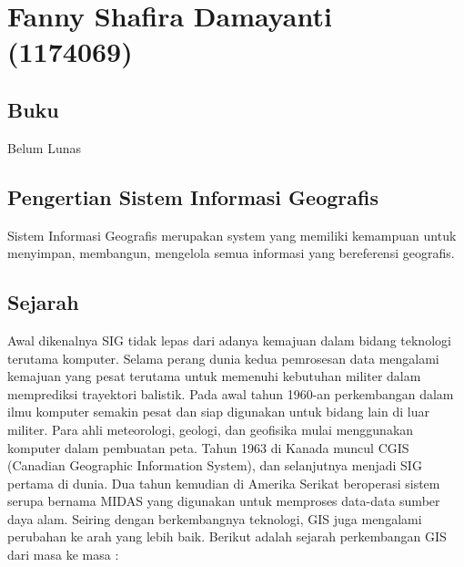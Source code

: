 \section{Fanny Shafira Damayanti (1174069)}
\subsection{Buku}
Belum Lunas
\subsection{Pengertian Sistem Informasi Geografis}
Sistem Informasi Geografis merupakan system yang memiliki kemampuan untuk menyimpan, membangun, mengelola semua informasi yang bereferensi geografis.
\subsection{Sejarah}
Awal dikenalnya SIG tidak lepas dari adanya kemajuan dalam bidang teknologi terutama komputer. Selama perang dunia kedua pemrosesan data mengalami kemajuan yang pesat terutama untuk memenuhi kebutuhan militer dalam memprediksi trayektori balistik. Pada awal tahun 1960-an perkembangan dalam ilmu komputer semakin pesat dan siap digunakan untuk bidang lain di luar militer. Para ahli meteorologi, geologi, dan geofisika mulai menggunakan komputer dalam pembuatan peta.
Tahun 1963 di Kanada muncul CGIS (Canadian Geographic Information System), dan selanjutnya menjadi SIG pertama di dunia. Dua tahun kemudian di Amerika Serikat beroperasi sistem serupa bernama MIDAS yang digunakan untuk memproses data-data sumber daya alam.
Seiring dengan berkembangnya teknologi, GIS juga mengalami perubahan ke arah yang lebih baik. Berikut adalah sejarah perkembangan GIS dari masa ke masa :
